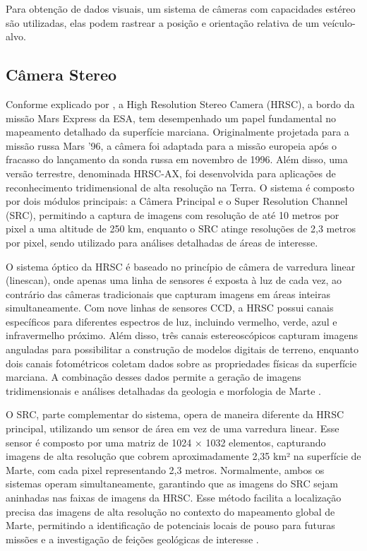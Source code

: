 Para obtenção de dados visuais, um sistema de câmeras com capacidades estéreo são utilizadas, elas podem rastrear a posição e orientação relativa de um veículo-alvo.

\subsection{Câmera Stereo}

Conforme explicado por \citep{esaMarsExpress}, a High Resolution Stereo Camera (HRSC), a bordo da missão Mars Express da ESA, tem desempenhado um papel fundamental no mapeamento detalhado da superfície marciana. Originalmente projetada para a missão russa Mars '96, a câmera foi adaptada para a missão europeia após o fracasso do lançamento da sonda russa em novembro de 1996. Além disso, uma versão terrestre, denominada HRSC-AX, foi desenvolvida para aplicações de reconhecimento tridimensional de alta resolução na Terra. O sistema é composto por dois módulos principais: a Câmera Principal e o Super Resolution Channel (SRC), permitindo a captura de imagens com resolução de até 10 metros por pixel a uma altitude de 250 km, enquanto o SRC atinge resoluções de 2,3 metros por pixel, sendo utilizado para análises detalhadas de áreas de interesse.

O sistema óptico da HRSC é baseado no princípio de câmera de varredura linear (linescan), onde apenas uma linha de sensores é exposta à luz de cada vez, ao contrário das câmeras tradicionais que capturam imagens em áreas inteiras simultaneamente. Com nove linhas de sensores CCD, a HRSC possui canais específicos para diferentes espectros de luz, incluindo vermelho, verde, azul e infravermelho próximo. Além disso, três canais estereoscópicos capturam imagens anguladas para possibilitar a construção de modelos digitais de terreno, enquanto dois canais fotométricos coletam dados sobre as propriedades físicas da superfície marciana. A combinação desses dados permite a geração de imagens tridimensionais e análises detalhadas da geologia e morfologia de Marte \citep{esaMarsExpress}.

O SRC, parte complementar do sistema, opera de maneira diferente da HRSC principal, utilizando um sensor de área em vez de uma varredura linear. Esse sensor é composto por uma matriz de 1024 × 1032 elementos, capturando imagens de alta resolução que cobrem aproximadamente 2,35 km² na superfície de Marte, com cada pixel representando 2,3 metros. Normalmente, ambos os sistemas operam simultaneamente, garantindo que as imagens do SRC sejam aninhadas nas faixas de imagens da HRSC. Esse método facilita a localização precisa das imagens de alta resolução no contexto do mapeamento global de Marte, permitindo a identificação de potenciais locais de pouso para futuras missões e a investigação de feições geológicas de interesse \citep{esaMarsExpress}.
